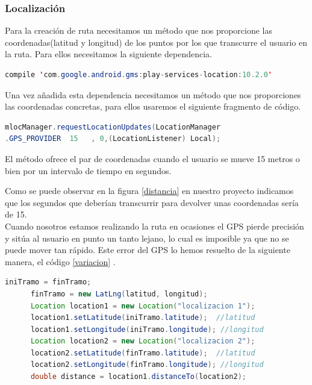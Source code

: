 
 
 \subsubsection{Localización}
  Para la creación de ruta necesitamos un método que nos proporcione las coordenadas(latitud y longitud) de los puntos por los que transcurre el usuario en la ruta. Para ellos necesitamos la siguiente dependencia.

	
\begin{lstlisting}[language=java,caption={Dependencia de Location en gradle},label=DescriptiveLabel]
compile 'com.google.android.gms:play-services-location:10.2.0'


\end{lstlisting}	
	
	
	Una vez añadida esta dependencia necesitamos un método que nos proporciones las coordenadas concretas, para ellos usaremos el siguiente fragmento de código.
	
\begin{lstlisting}[language=java,caption={Obtencion de coordenadas  por intervalo de tiempo},label=distancia]
mlocManager.requestLocationUpdates(LocationManager
.GPS_PROVIDER  15   , 0,(LocationListener) Local);


\end{lstlisting}	

El método ofrece el par de coordenadas cuando el usuario se mueve 15 metros o bien por un intervalo de tiempo en segundos.


Como se puede observar en la figura \ref{distancia} en nuestro proyecto indicamos que los segundos que deberían transcurrir para devolver unas coordenadas sería de 15.\\
Cuando nosotros estamos realizando la ruta en ocasiones el GPS pierde precisión y sitúa al usuario en punto un tanto lejano, lo cual es imposible ya que no se puede mover tan rápido. Este error del GPS lo hemos resuelto de la siguiente manera, el código \ref{variacion} .\\




\begin{lstlisting}[language=java,caption={Fragmento para el calculo de distancias entre puntos},label=variacion]
      iniTramo = finTramo;
      finTramo = new LatLng(latitud, longitud);
      Location location1 = new Location("localizacion 1");
      location1.setLatitude(iniTramo.latitude);  //latitud
      location1.setLongitude(iniTramo.longitude); //longitud
      Location location2 = new Location("localizacion 2");
      location2.setLatitude(finTramo.latitude);  //latitud
      location2.setLongitude(finTramo.longitude); //longitud
      double distance = location1.distanceTo(location2);
\end{lstlisting}

